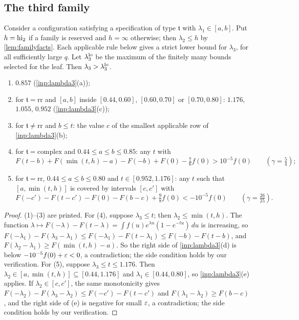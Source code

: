 \subsection{The third family}

\begin{proposition}\label{prop:third}
Consider a configuration satisfying a specification of type $\mathfrak t$ with
$\lambda_1\in[a,b]$. Put $h=\mathrm{hi}_2$ if a family is reserved and $h=\infty$ otherwise;
then $\lambda_2\le h$ by \cref{lem:familyfacts}.
Each applicable rule below gives a strict lower bound for $\lambda_3$, for all
sufficiently large $q$. Let $\lambda_3^{\mathrm{lo}}$ be the maximum of the finitely many bounds
selected for the leaf. Then $\lambda_3>\lambda_3^{\mathrm{lo}}$.
\begin{enumerate}[(1)]
  \item $0.857$ (\cref{inp:lambda3}(a));
  \item for $\mathfrak t=\mathrm{rr}$ and $[a,b]$ inside $[0.44,0.60]$, $[0.60,0.70]$ or $[0.70,0.80]$: $1.176$,
    $1.055$, $0.952$ (\cref{inp:lambda3}(c));
  \item for $\mathfrak t\ne\mathrm{rr}$ and $b\le t$: the value $c$ of the smallest applicable row of
    \cref{inp:lambda3}(b);
  \item for $\mathfrak t=\mathrm{complex}$ and $0.44\le a\le b\le0.85$: any $t$ with
    \[
      F(t-b)+F(\min(t,h)-a)-F(-b)+F(0)-\tfrac76f(0)>10^{-5}f(0)\qquad(\gamma=\tfrac54);
    \]
  \item for $\mathfrak t=\mathrm{rr}$, $0.44\le a\le b\le0.80$ and $t\in[0.952,1.176]$: any $t$ such that
    $[a,\min(t,h)]$ is covered by intervals $[c,c']$ with
    \[
      F(-c')-F(t-c')-F(0)-F(b-c)+\tfrac98f(0)<-10^{-5}f(0)\qquad(\gamma=\tfrac{26}{25}).
    \]
\end{enumerate}
\end{proposition}

\begin{proof}
(1)--(3) are printed. For (4), suppose $\lambda_3\le t$; then $\lambda_2\le\min(t,h)$. The function
$\lambda\mapsto F(-\lambda)-F(t-\lambda)=\int f(u)e^{\lambda u}(1-e^{-tu})\,du$ is increasing, so
$F(-\lambda_1)-F(\lambda_3-\lambda_1)\le F(-\lambda_1)-F(t-\lambda_1)\le F(-b)-F(t-b)$, and
$F(\lambda_2-\lambda_1)\ge F(\min(t,h)-a)$. So the right side of \cref{inp:lambda3}(d) is below
$-10^{-5}f(0)+\varepsilon<0$, a contradiction; the side condition \cite[(4.29)]{Xylouris2011nullstellen} holds by our verification. For (5),
suppose $\lambda_3\le t\le1.176$. Then $\lambda_2\in[a,\min(t,h)]\subseteq[0.44,1.176]$ and
$\lambda_1\in[0.44,0.80]$, so \cref{inp:lambda3}(e) applies. If $\lambda_2\in[c,c']$, the same monotonicity gives
$F(-\lambda_2)-F(\lambda_3-\lambda_2)\le F(-c')-F(t-c')$ and $F(\lambda_1-\lambda_2)\ge F(b-c)$, and the right side of
(e) is negative for small $\varepsilon$, a contradiction; the side condition \cite[(4.34)]{Xylouris2011nullstellen} holds
by our verification.
\end{proof}

